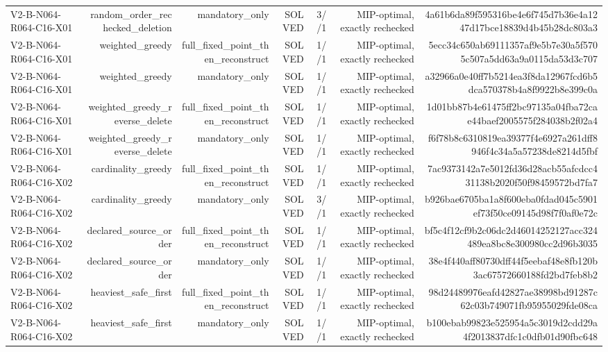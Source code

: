 {\begin{longtable}{lrrrrrr}
V2-B-N064-R064-C16-X01 & random\_order\_rechecked\_deletion & mandatory\_only & SOLVED & 3//1 & MIP-optimal, exactly rechecked & 4a61b6da89f595316be4e6f745d7b36e4a1247d17bce18839d4b45b28dc803a3 \\
V2-B-N064-R064-C16-X01 & weighted\_greedy & full\_fixed\_point\_then\_reconstruct & SOLVED & 1//1 & MIP-optimal, exactly rechecked & 5ecc34c650ab69111357af9e5b7e30a5f5705c507a5dd63a9a0115da53d3c707 \\
V2-B-N064-R064-C16-X01 & weighted\_greedy & mandatory\_only & SOLVED & 1//1 & MIP-optimal, exactly rechecked & a32966a0e40ff7b5214ea3f8da12967fcd6b5dca570378b4a8f9922b8e399c0a \\
V2-B-N064-R064-C16-X01 & weighted\_greedy\_reverse\_delete & full\_fixed\_point\_then\_reconstruct & SOLVED & 1//1 & MIP-optimal, exactly rechecked & 1d01bb87b4e61475ff2bc97135a04fba72cae44baef2005575f284038b2f02a4 \\
V2-B-N064-R064-C16-X01 & weighted\_greedy\_reverse\_delete & mandatory\_only & SOLVED & 1//1 & MIP-optimal, exactly rechecked & f6f78b8c6310819ea39377f4e6927a261dff8946f4c34a5a57238de8214d5fbf \\
V2-B-N064-R064-C16-X02 & cardinality\_greedy & full\_fixed\_point\_then\_reconstruct & SOLVED & 1//1 & MIP-optimal, exactly rechecked & 7ac9373142a7e5012fd36d28acb55afcdcc431138b2020f50f98459572bd7fa7 \\
V2-B-N064-R064-C16-X02 & cardinality\_greedy & mandatory\_only & SOLVED & 3//1 & MIP-optimal, exactly rechecked & b926bae6705ba1a8f600eba0fdad045c5901ef73f50ce09145d98f7f0af0e72c \\
V2-B-N064-R064-C16-X02 & declared\_source\_order & full\_fixed\_point\_then\_reconstruct & SOLVED & 1//1 & MIP-optimal, exactly rechecked & bf5c4f12cf9b2c06dc2d46014252127acc324489ea8bc8e300980cc2d96b3035 \\
V2-B-N064-R064-C16-X02 & declared\_source\_order & mandatory\_only & SOLVED & 1//1 & MIP-optimal, exactly rechecked & 38e4f440aff80730dff44f5eebaf48e8fb120b3ac67572660188fd2bd7feb8b2 \\
V2-B-N064-R064-C16-X02 & heaviest\_safe\_first & full\_fixed\_point\_then\_reconstruct & SOLVED & 1//1 & MIP-optimal, exactly rechecked & 98d24489976eafd42827ae38998bd91287c62c03b749071fb95955029fde08ca \\
V2-B-N064-R064-C16-X02 & heaviest\_safe\_first & mandatory\_only & SOLVED & 1//1 & MIP-optimal, exactly rechecked & b100ebab99823e525954a5c3019d2cdd29a4f2013837dfc1c0dfb01d90fbc648 \\

\end{longtable}}
